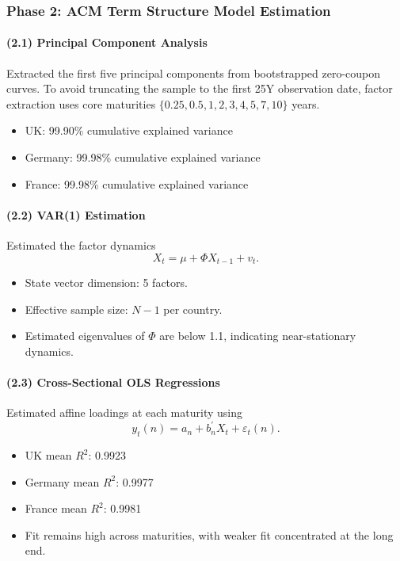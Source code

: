 \subsubsection{Phase 2: ACM Term Structure Model Estimation}

\paragraph{(2.1) Principal Component Analysis}
Extracted the first five principal components from bootstrapped zero-coupon curves.
To avoid truncating the sample to the first 25Y observation date, factor extraction uses core maturities
$\{0.25,0.5,1,2,3,4,5,7,10\}$ years.
\begin{itemize}
  \item UK: 99.90\% cumulative explained variance
  \item Germany: 99.98\% cumulative explained variance
  \item France: 99.98\% cumulative explained variance
\end{itemize}

\paragraph{(2.2) VAR(1) Estimation}
Estimated the factor dynamics
\begin{equation}
X_t = \mu + \Phi X_{t-1} + v_t.
\end{equation}

\begin{itemize}
  \item State vector dimension: 5 factors.
  \item Effective sample size: $N-1$ per country.
  \item Estimated eigenvalues of $\Phi$ are below 1.1, indicating near-stationary dynamics.
\end{itemize}

\paragraph{(2.3) Cross-Sectional OLS Regressions}
Estimated affine loadings at each maturity using
\begin{equation}
y_t(n) = a_n + b_n^\prime X_t + \varepsilon_t(n).
\end{equation}

\begin{itemize}
  \item UK mean $R^2$: 0.9923
  \item Germany mean $R^2$: 0.9977
  \item France mean $R^2$: 0.9981
  \item Fit remains high across maturities, with weaker fit concentrated at the long end.
\end{itemize}

